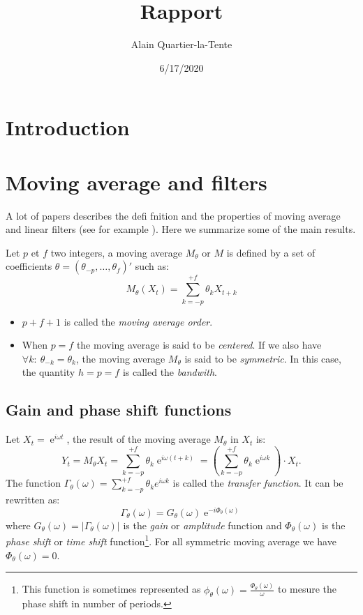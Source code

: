 \documentclass[
  12pt,
  ,
  a4paper]{article}
\title{Rapport}
\author{Alain Quartier-la-Tente}
\date{6/17/2020}
\DeclareMathOperator{\e}{e}
\newcommand\1{\mathds{1}}
\begin{document}
\maketitle

{
\hypersetup{linkcolor=}
\setcounter{tocdepth}{3}
\tableofcontents
}
\newpage

\hypertarget{introduction}{%
\section{Introduction}\label{introduction}}

\hypertarget{moving-average-and-filters}{%
\section{Moving average and filters}\label{moving-average-and-filters}}

A lot of papers describes the defi fnition and the properties of moving average and linear filters (see for example \textcite{ch12HBSA}).
Here we summarize some of the main results.

Let \(p\) et \(f\) two integers, a moving average \(M_\theta\) or \(M\) is defined by a set of coefficients \(\theta=(\theta_{-p},\dots,\theta_{f})'\) such as:
\[
M_\theta(X_t)=\sum_{k=-p}^{+f}\theta_kX_{t+k}
\]

\begin{itemize}
\item
  \(p+f+1\) is called the \emph{moving average order}.
\item
  When \(p=f\) the moving average is said to be \emph{centered}.
  If we also have \(\forall k:\:\theta_{-k} = \theta_k\), the moving average \(M_\theta\) is said to be \emph{symmetric}.
  In this case, the quantity \(h=p=f\) is called the \emph{bandwith}.
\end{itemize}

\hypertarget{gain-and-phase-shift-functions}{%
\subsection{Gain and phase shift functions}\label{gain-and-phase-shift-functions}}

Let \(X_t=\e^{i\omega t}\), the result of the moving average \(M_\theta\) in \(X_t\) is:
\[
Y_t = M_{\theta}X_t = \sum_{k=-p}^{+f} \theta_k \e^{i \omega (t+k)}
= \left(\sum_{k=-p}^{+f} \theta_k \e^{i \omega k}\right)\cdot X_t.
\]
The function \(\Gamma_\theta(\omega)=\sum_{k=-p}^{+f} \theta_k e^{i \omega k}\) is called the \emph{transfer function}.
It can be rewritten as:
\[
\Gamma_\theta(\omega) = G_\theta(\omega)\e^{-i\Phi_\theta(\omega)}
\]
where \(G_\theta(\omega)=\lvert\Gamma_\theta(\omega)\rvert\) is the \emph{gain} or \emph{amplitude} function and \(\Phi_\theta(\omega)\) is the \emph{phase shift} or \emph{time shift} function\footnote{This function is sometimes represented as \(\phi_\theta(\omega)=\frac{\Phi_\theta(\omega)}{\omega}\) to mesure the phase shift in number of periods.}.
For all symmetric moving average we have \(\Phi_\theta(\omega)=0\).
\end{document}
